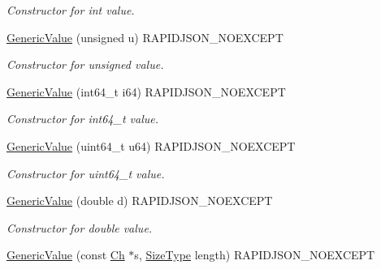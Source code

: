 \begin{DoxyCompactItemize}
\begin{DoxyCompactList}\small\item\em Constructor for int value. \end{DoxyCompactList}\item 
\hyperlink{class_generic_value_a972bff6c56ac3d04622ff7fad8d98331}{Generic\+Value} (unsigned u) R\+A\+P\+I\+D\+J\+S\+O\+N\+\_\+\+N\+O\+E\+X\+C\+E\+PT\hypertarget{class_generic_value_a972bff6c56ac3d04622ff7fad8d98331}{}\label{class_generic_value_a972bff6c56ac3d04622ff7fad8d98331}

\begin{DoxyCompactList}\small\item\em Constructor for unsigned value. \end{DoxyCompactList}\item 
\hyperlink{class_generic_value_a964b69f1d2596f75ded5421b6db01a14}{Generic\+Value} (int64\+\_\+t i64) R\+A\+P\+I\+D\+J\+S\+O\+N\+\_\+\+N\+O\+E\+X\+C\+E\+PT\hypertarget{class_generic_value_a964b69f1d2596f75ded5421b6db01a14}{}\label{class_generic_value_a964b69f1d2596f75ded5421b6db01a14}

\begin{DoxyCompactList}\small\item\em Constructor for int64\+\_\+t value. \end{DoxyCompactList}\item 
\hyperlink{class_generic_value_ad04805a57f5050c8e04be469ba64d6f3}{Generic\+Value} (uint64\+\_\+t u64) R\+A\+P\+I\+D\+J\+S\+O\+N\+\_\+\+N\+O\+E\+X\+C\+E\+PT\hypertarget{class_generic_value_ad04805a57f5050c8e04be469ba64d6f3}{}\label{class_generic_value_ad04805a57f5050c8e04be469ba64d6f3}

\begin{DoxyCompactList}\small\item\em Constructor for uint64\+\_\+t value. \end{DoxyCompactList}\item 
\hyperlink{class_generic_value_a267d05b7e98c3507908eaf085fe41155}{Generic\+Value} (double d) R\+A\+P\+I\+D\+J\+S\+O\+N\+\_\+\+N\+O\+E\+X\+C\+E\+PT\hypertarget{class_generic_value_a267d05b7e98c3507908eaf085fe41155}{}\label{class_generic_value_a267d05b7e98c3507908eaf085fe41155}

\begin{DoxyCompactList}\small\item\em Constructor for double value. \end{DoxyCompactList}\item 
\hyperlink{class_generic_value_a4d9af98141360cd801daab4ed1ca2c91}{Generic\+Value} (const \hyperlink{class_generic_value_ade0e0ce64ccd5d852da57a35e720bafb}{Ch} $\ast$s, \hyperlink{rapidjson_8h_a5ed6e6e67250fadbd041127e6386dcb5}{Size\+Type} length) R\+A\+P\+I\+D\+J\+S\+O\+N\+\_\+\+N\+O\+E\+X\+C\+E\+PT\hypertarget{class_generic_value_a4d9af98141360cd801daab4ed1ca2c91}{}\label{class_generic_value_a4d9af98141360cd801daab4ed1ca2c91}


\end{DoxyCompactItemize}
